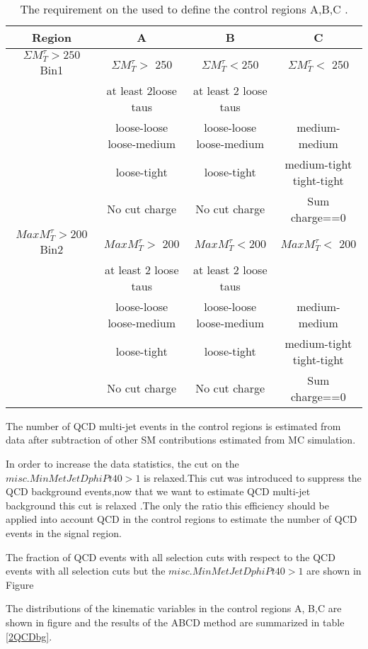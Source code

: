 \begin{table}
\begin{center}
\begin{tabular}{|c|c|c|c|}
\hline
Region&A& B & C
\\ \hline\hline
$\Sigma M_{T}^{\tau}>250$ Bin1 &$\Sigma M_{T}^{\tau} >$ 250&$\Sigma M_{T}^{\tau} <$250&$\Sigma M_{T}^{\tau} <$ 250\\
 &at least 2loose taus&at least 2 loose taus& \\
 &loose-loose loose-medium &loose-loose loose-medium &medium-medium \\
 &loose-tight&loose-tight&medium-tight tight-tight\\
 &No cut charge&No cut charge& Sum charge==0\\
\hline
$MaxM_{T}^{\tau}>200$ Bin2 &$Max M_{T}^{\tau} >$ 200&$Max M_{T}^{\tau} <$200&$Max M_{T}^{\tau} <$ 200\\
 &at least 2 loose taus&at least 2 loose taus& \\
 &loose-loose loose-medium &loose-loose loose-medium &medium-medium \\
 &loose-tight&loose-tight&medium-tight tight-tight\\ 
 &No cut charge&No cut charge& Sum charge==0\\

\hline
\end{tabular}
\caption{  The requirement on the  used to define the control regions A,B,C
.  }
\label{1QCDbg}
\end{center}
\end{table}

The number of QCD multi-jet events in the control regions is estimated from data after subtraction of other SM contributions estimated from MC simulation.

In order to increase the data statistics, the cut on the $misc.MinMetJetDphiPt40>1$ is relaxed.This cut was
introduced to suppress the QCD background events,now that we want to estimate QCD multi-jet background this cut is relaxed  .The only the ratio this efficiency should be
applied into account QCD in the control regions to estimate the number of QCD events in the signal region.

The fraction of QCD events with all selection cuts with respect to the QCD events with all selection cuts but the
$misc.MinMetJetDphiPt40>1$ are shown in Figure  


The distributions of the kinematic variables in the control regions A, B,C are shown in figure and the results of the ABCD method are summarized in table \ref{2QCDbg}.

